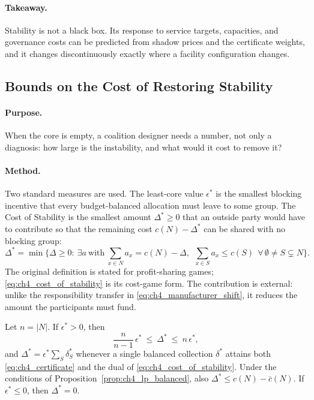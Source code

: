 \paragraph{Takeaway.} Stability is not a black box. Its response to service targets, capacities, and governance costs can be predicted from shadow prices and the certificate weights, and it changes discontinuously exactly where a facility configuration changes.

\subsection{Bounds on the Cost of Restoring Stability}
\label{sec:ch4_bounds_theory}

\paragraph{Purpose.} When the core is empty, a coalition designer needs a number, not only a diagnosis: how large is the instability, and what would it cost to remove it?

\paragraph{Method.} Two standard measures are used. The least-core value $\epsilon^*$ is the smallest blocking incentive that every budget-balanced allocation must leave to some group. The Cost of Stability \cite{Bachrach2009CostStability} is the smallest amount $\Delta^*\geq0$ that an outside party would have to contribute so that the remaining cost $c(N)-\Delta^*$ can be shared with no blocking group:
\begin{equation}
\label{eq:ch4_cost_of_stability}
\Delta^*=\min\Big\{\Delta\geq0:\ \exists a\ \text{with}\ \sum_{x\in N}a_x=c(N)-\Delta,\ \ \sum_{x\in S}a_x\leq c(S)\ \ \forall\,\emptyset\neq S\subsetneq N\Big\}.
\end{equation}
The original definition is stated for profit-sharing games; \eqref{eq:ch4_cost_of_stability} is its cost-game form. The contribution is external: unlike the responsibility transfer in \eqref{eq:ch4_manufacturer_shift}, it reduces the amount the participants must fund.

\begin{proposition}
\label{prop:ch4_cos_bounds}
Let $n=|N|$. If $\epsilon^*>0$, then
\begin{equation}
\label{eq:ch4_cos_bounds}
\frac{n}{n-1}\,\epsilon^*\ \leq\ \Delta^*\ \leq\ n\,\epsilon^*,
\end{equation}
and $\Delta^*=\epsilon^*\sum_S\delta^*_S$ whenever a single balanced collection $\delta^*$ attains both \eqref{eq:ch4_certificate} and the dual of \eqref{eq:ch4_cost_of_stability}. Under the conditions of Proposition~\ref{prop:ch4_lp_balanced}, also $\Delta^*\leq c(N)-\bar c(N)$. If $\epsilon^*\leq0$, then $\Delta^*=0$.
\end{proposition}

